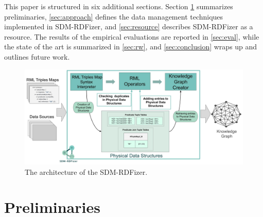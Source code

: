 This paper is structured in six additional sections. Section \ref{sec:pre} summarizes preliminaries, \autoref{sec:approach} defines the data management techniques implemented in SDM-RDFizer, and \autoref{sec:resource} describes SDM-RDFizer as a resource. The results of the empirical evaluations are reported in \autoref{sec:eval}, while the state of the art is summarized in \autoref{sec:rw}, and \autoref{sec:conclusion} wraps up and outlines future work.    
\begin{figure}[t!]
    \centering
    \includegraphics[width=1\textwidth]{figures/architecture_v1.1.jpg}
    \caption{The architecture of the SDM-RDFizer.}
    \label{fig:architecture}
\end{figure}
\section{Preliminaries}
\label{sec:pre}
